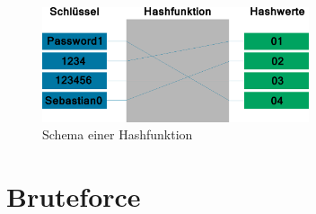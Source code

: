 \documentclass[12pt,a4paper]{scrartcl}
\begin{document}
	
	
\begin{figure}[!h]
	\vspace{0.5cm}
	\centering
	\includegraphics[width=0.7\textwidth]{hashfunktion}
	\caption[Caption for LOF]{Schema einer Hashfunktion\footnotemark}
	\label{fig:hashfunktion}
\end{figure}
\newpage
\section{Bruteforce}


\newpage
\end{document}
